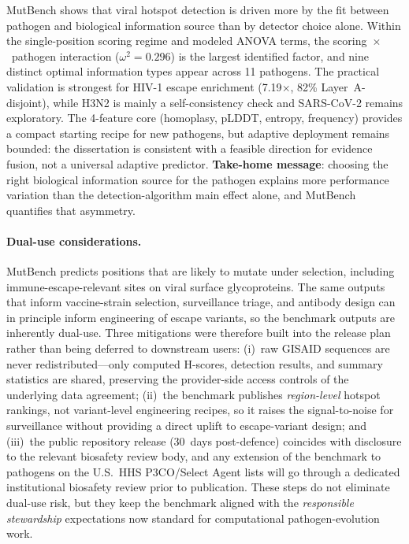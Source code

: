 MutBench shows that viral hotspot detection is driven more by the fit between pathogen and biological information source than by detector choice alone.
Within the single-position scoring regime and modeled ANOVA terms, the scoring~$\times$~pathogen interaction ($\omega^2=0.296$) is the largest identified factor, and nine distinct optimal information types appear across 11 pathogens.
The practical validation is strongest for HIV-1 escape enrichment (7.19$\times$, 82\% Layer~A-disjoint), while H3N2 is mainly a self-consistency check and SARS-CoV-2 remains exploratory.
The 4-feature core (homoplasy, pLDDT, entropy, frequency) provides a compact starting recipe for new pathogens, but adaptive deployment remains bounded: the dissertation is consistent with a feasible direction for evidence fusion, not a universal adaptive predictor.
\textbf{Take-home message}: choosing the right biological information source for the pathogen explains more performance variation than the detection-algorithm main effect alone, and MutBench quantifies that asymmetry.

\paragraph{Dual-use considerations.} MutBench predicts positions that are likely to mutate under selection, including immune-escape-relevant sites on viral surface glycoproteins. The same outputs that inform vaccine-strain selection, surveillance triage, and antibody design can in principle inform engineering of escape variants, so the benchmark outputs are inherently dual-use. Three mitigations were therefore built into the release plan rather than being deferred to downstream users: (i)~raw GISAID sequences are never redistributed---only computed H-scores, detection results, and summary statistics are shared, preserving the provider-side access controls of the underlying data agreement; (ii)~the benchmark publishes \emph{region-level} hotspot rankings, not variant-level engineering recipes, so it raises the signal-to-noise for surveillance without providing a direct uplift to escape-variant design; and (iii)~the public repository release (30~days post-defence) coincides with disclosure to the relevant biosafety review body, and any extension of the benchmark to pathogens on the U.S.\ HHS P3CO/Select Agent lists will go through a dedicated institutional biosafety review prior to publication. These steps do not eliminate dual-use risk, but they keep the benchmark aligned with the \emph{responsible stewardship} expectations now standard for computational pathogen-evolution work.

